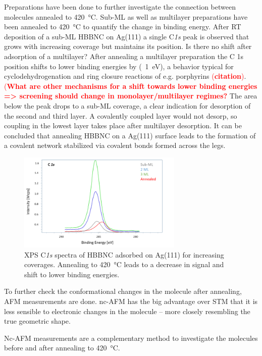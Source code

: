 Preparations have been done to further investigate the connection between molecules annealed to \SI{420}{\celsius}. Sub-ML as well as multilayer preparations have been annealed to \SI{420}{\celsius} to quantify the change in binding energy. After RT deposition of a sub-ML HBBNC on Ag(111) a single C\textit{1s} peak is observed that grows with increasing coverage but maintains its position.
Is there no shift after adsorption of a multilayer?
After annealing a multilayer preparation the C 1s position shifts to lower binding energies by (~\SI{1}{\eV}), a behavior typical for cyclodehydrogenation and ring closure reactions of e.g. porphyrins \textcolor{red}{(\textbf{citation})}. \textcolor{red}{(\textbf{What are other mechanisms for a shift towards lower binding energies => screening should change in monolayer/multilayer regimes?}} The area below the peak drops to a sub-ML coverage, a clear indication for desorption of the second and third layer. A covalently coupled layer would not desorp, so coupling in the lowest layer takes place after multilayer desorption.
It can be concluded that annealing HBBNC on a Ag(111) surface leads to the formation of a covalent network stabilized via covalent bonds formed across the legs.

\begin{figure}[] \centering
	\includegraphics[width=0.7\textwidth]{./images/hbbnc-xps1}
	\caption{XPS C\textit{1s} spectra of HBBNC adsorbed on Ag(111) for increasing coverages. Annealing to \SI{420}{\celsius} leads to a decrease in signal and shift to lower binding energies.}
	\label{}
\end{figure}

To further check the conformational changes in the molecule after annealing, AFM measurements are done. nc-AFM has the big advantage over STM that it is less sensible to electronic changes in the molecule – more closely resembling the true geometric shape.

Nc-AFM measurements are a complementary method to investigate the molecules before and after annealing to \SI{420}{\celsius}. 

